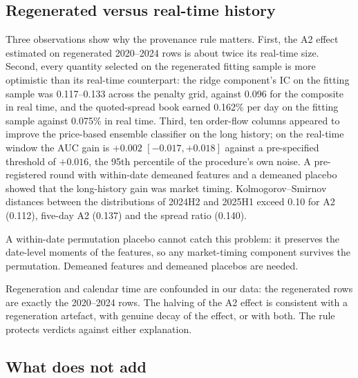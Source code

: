 \subsection{Regenerated versus real-time history}\label{sec:regen}

Three observations show why the provenance rule matters. First, the A2 effect estimated on regenerated 2020--2024 rows is about twice its real-time size. Second, every quantity selected on the regenerated fitting sample is more optimistic than its real-time counterpart: the ridge component's IC on the fitting sample was 0.117--0.133 across the penalty grid, against 0.096 for the composite in real time, and the quoted-spread book earned 0.162\% per day on the fitting sample against 0.075\% in real time. Third, ten order-flow columns appeared to improve the price-based ensemble classifier on the long history; on the real-time window the AUC gain is $+0.002$ $[-0.017,+0.018]$ against a pre-specified threshold of $+0.016$, the 95th percentile of the procedure's own noise. A pre-registered round with within-date demeaned features and a demeaned placebo showed that the long-history gain was market timing. Kolmogorov--Smirnov distances between the distributions of 2024H2 and 2025H1 exceed 0.10 for A2 (0.112), five-day A2 (0.137) and the spread ratio (0.140).

A within-date permutation placebo cannot catch this problem: it preserves the date-level moments of the features, so any market-timing component survives the permutation. Demeaned features and demeaned placebos are needed.

Regeneration and calendar time are confounded in our data: the regenerated rows are exactly the 2020--2024 rows. The halving of the A2 effect is consistent with a regeneration artefact, with genuine decay of the effect, or with both. The rule protects verdicts against either explanation.

\subsection{What does not add}\label{sec:noadd}


